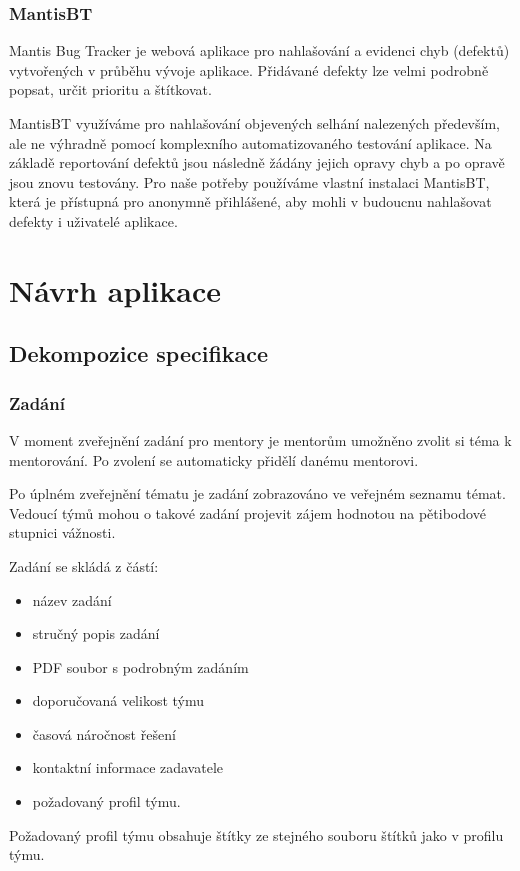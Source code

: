\documentclass[czech,BP]{thesiskiv}
\begin{document}
\subsection{MantisBT}
	\par Mantis Bug Tracker je webová aplikace pro nahlašování a evidenci chyb (defektů) vytvořených v průběhu vývoje aplikace. Přidávané defekty lze velmi podrobně popsat, určit prioritu a štítkovat.
	\par MantisBT využíváme pro nahlašování objevených selhání nalezených především, ale ne výhradně pomocí komplexního automatizovaného testování aplikace. Na základě reportování defektů jsou následně žádány jejich opravy chyb a po opravě jsou znovu testovány. Pro naše potřeby používáme vlastní instalaci MantisBT, která je přístupná pro anonymně přihlášené, aby mohli v budoucnu nahlašovat defekty i uživatelé aplikace.
\chapter{Návrh aplikace}

	\section{Dekompozice specifikace}
		\subsection{Zadání}
		\par V moment zveřejnění zadání pro mentory je mentorům umožněno zvolit si téma k mentorování. Po zvolení se automaticky přidělí danému mentorovi.
		\par Po úplném zveřejnění tématu je zadání zobrazováno ve veřejném seznamu témat. Vedoucí týmů mohou o takové zadání projevit zájem hodnotou na pětibodové stupnici vážnosti.
		\par Zadání se skládá z částí:
		\begin{itemize}
			\item název zadání
			\item stručný popis zadání
			\item PDF soubor s podrobným zadáním
			\item doporučovaná velikost týmu
			\item časová náročnost řešení
			\item kontaktní informace zadavatele
			\item požadovaný profil týmu.
		\end{itemize}
		\par Požadovaný profil týmu obsahuje štítky ze stejného souboru štítků jako v profilu týmu.
\end{document}
